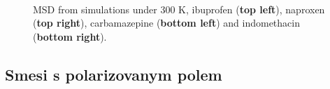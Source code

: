 \begin{figure}[htb]
	\centering
	\\
	\caption{MSD from simulations under 300 K, ibuprofen (\textbf{top left}), naproxen (\textbf{top right}), carbamazepine (\textbf{bottom left}) and indomethacin (\textbf{bottom right}).}
	\label{fig:msd_r1}    
\end{figure}

\subsection{Smesi s polarizovanym polem}

